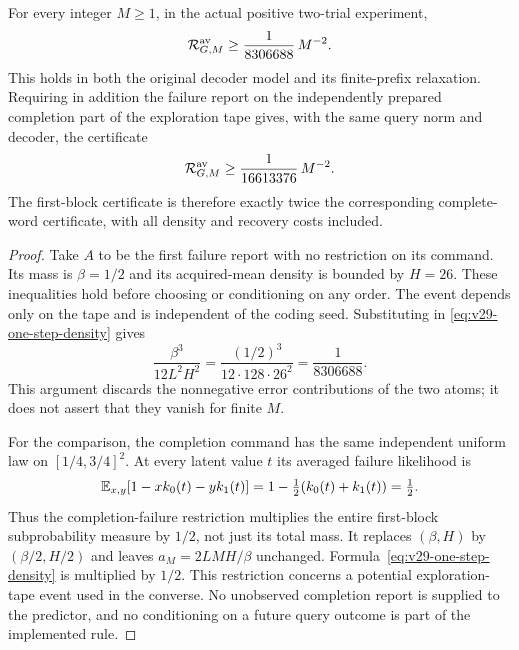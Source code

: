 \begin{theorem}
\label{thm:v29-evaluated}
For every integer $M\ge1$, in the actual positive two-trial experiment,
\begin{equation}\label{eq:v29-explicit}
           \mathcal R^{\rm av}_{G,M}\ge
                                  \frac{1}{8306688}\,M^{-2}.
\end{equation}
This holds in both the original decoder model and its finite-prefix
relaxation. Requiring in addition the failure report on the independently
prepared completion part of the exploration tape gives, with the same
query norm and decoder, the certificate
\begin{equation}\label{eq:v29-completion}
           \mathcal R^{\rm av}_{G,M}\ge
                                  \frac{1}{16613376}\,M^{-2}.
\end{equation}
The first-block certificate is therefore exactly twice the corresponding
complete-word certificate, with all density and recovery costs included.
\end{theorem}
\begin{proof}
Take $A$ to be the first failure report with no restriction on its
command. Its mass is $\beta=1/2$ and its acquired-mean density is bounded
by $H=26$. These inequalities hold before choosing or conditioning on
any order. The event depends only on the tape and is independent of
the coding seed. Substituting in
\eqref{eq:v29-one-step-density} gives
\[
 \frac{\beta^3}{12L^2H^2}
    =\frac{(1/2)^3}{12\cdot128\cdot26^2}
    =\frac1{8306688}.
\]
This argument discards the nonnegative error contributions of the two
atoms; it does not assert that they vanish for finite $M$.

For the comparison, the completion command has the same independent
uniform law on $[1/4,3/4]^2$. At every latent value $t$ its averaged
failure likelihood is
\[
 \mathbb E_{x,y}[1-xk_0(t)-yk_1(t)]
              =1-\tfrac12(k_0(t)+k_1(t))=\tfrac12.
\]
Thus the completion-failure restriction multiplies the entire first-block
subprobability measure by $1/2$, not just its total mass. It replaces
$(\beta,H)$ by $(\beta/2,H/2)$ and leaves $a_M=2LMH/\beta$ unchanged.
Formula~\eqref{eq:v29-one-step-density} is multiplied by $1/2$.
This restriction concerns a potential exploration-tape event used in
the converse. No unobserved completion report is supplied to the
predictor, and no conditioning on a future query outcome is part of
the implemented rule.
\end{proof}

